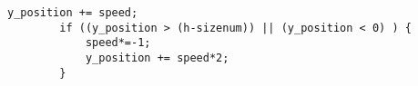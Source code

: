 \begin{lstlisting}[numbers=none]
		y_position += speed;
		if ((y_position > (h-sizenum)) || (y_position < 0) ) { 
			speed*=-1;
			y_position += speed*2;
		}
	
\end{lstlisting}